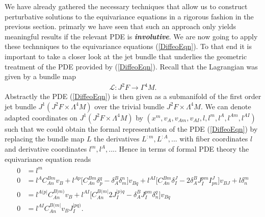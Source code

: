 \documentclass[a4paper,12pt, DIV=14, BCOR=5mm, twoside, headsepline, numbers=noenddot]{scrbook}
\begin{document}
We have already gathered the necessary techniques that allow us to construct perturbative solutions to the equivariance equations in a rigorous fashion in the previous section. primarly we have seen that such an approach only yields meaningful results if the relevant PDE is \textit{\textbf{involutive}}. We are now going to apply these technniques to the equivariance equations (\ref{DiffeoEqn}). To that end it is important to take a closer look at the jet bundle that underlies the  geometric treatment of the PDE provided by (\ref{DiffeoEqn}). Recall that the Lagrangian was given by a bundle map 
\begin{align}
\mathcal{L} : J^2F \longrightarrow \Gamma^4M.
\end{align}
Abstractly the PDE (\ref{DiffeoEqn}) is then given as a submanifold of the first order jet bundle $J^1(J^2F \times \Lambda^4M)$ over the trivial bundle $J^2F \times \Lambda^4M$. 
We can denote adapted coordinates on $J^1(J^2F \times \Lambda^4M)$ by $(x^m,v_A,v_{Am},v_{AI},l,l^{m},l^{A},l^{Am},l^{AI})$ such that we could obtain the formal representation of the PDE (\ref{DiffeoEqn}) by replacing the bundle map $L$ the derivatives $L^{:m},L^{:A},...$ with fiber coordinates $l$ and derivative coordinates $l^m,l^A,...$. Hence in terms of formal PDE theory the equivariance equation reads 
\begin{align}\label{DiffeoEqnFormal}
\begin{aligned}
    0 &= l^{m} \\
    0 &= l^{A} C_{An}^{Bm} v_B + l^{Ap} \bigl[ C_{An}^{Bm} \delta_p^q - \delta_A^B \delta_m^n \bigr] v_{Bq} + l^{AI} \bigl[ C_{An}^{Bm} \delta_I^J - 2 \delta_A^B J_I^{pm} I^J_{pn}  \bigr] v_{BJ} + l \delta^m_n \\
    0 &= l^{A(p\vert}C_{An}^{B \vert m)} v_B + l^{ AI} \bigl[ C_{An}^{B(m\vert} 2 J_I^{\vert p) q} - \delta^B_A J_I ^{pm} \delta_n^q \bigr] v_{Bq} \\
    0 &= l^{AI} C_{An}^{B(m\vert} v_B J_I^{\vert p q )}.
    \end{aligned}
\end{align}
\end{document}
